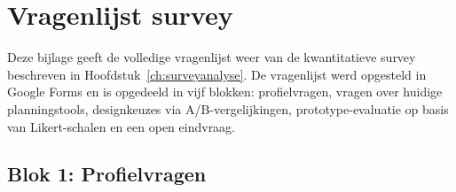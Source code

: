 
\chapter{Vragenlijst survey}%
\label{bijl:surveyanalyse}

Deze bijlage geeft de volledige vragenlijst weer van de kwantitatieve survey
beschreven in Hoofdstuk~\ref{ch:surveyanalyse}. De vragenlijst werd opgesteld
in Google Forms en is opgedeeld in vijf blokken: profielvragen, vragen over
huidige planningstools, designkeuzes via A/B-vergelijkingen,
prototype-evaluatie op basis van Likert-schalen en een open eindvraag.

\section*{Blok 1: Profielvragen}

